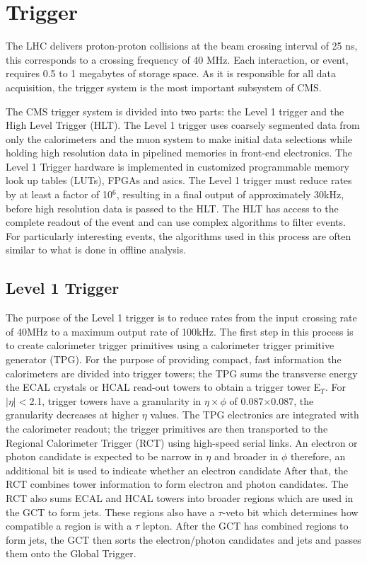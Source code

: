 \section{Trigger}
The LHC delivers proton-proton collisions at the beam crossing 
interval of 25 ns, this corresponds to a crossing frequency of 40 MHz.
Each interaction, or event, requires 0.5 to 1 megabytes of storage space.
As it is responsible for all data acquisition, %
the trigger system is the most important subsystem of CMS. 

The CMS trigger system is divided into two parts: the Level 1 trigger 
and the High Level Trigger (HLT). 
The Level 1 trigger uses coarsely segmented
data from only the calorimeters and the muon system to make initial
data selections while holding high resolution data in pipelined memories
in front-end electronics. The Level 1 Trigger hardware is implemented in customized
programmable memory look up tables (LUTs), FPGAs and asics.
The Level 1 trigger must reduce rates by at least a factor of 10$^{6}$, 
resulting in a final output of approximately 30kHz,
before high resolution data is passed to the HLT.
The HLT has access to the complete readout of the event and can use
complex algorithms to filter events. For particularly interesting events, 
the algorithms used in this process are often similar to what is done in 
offline analysis. 
  \subsection{Level 1 Trigger}
The purpose of the Level 1 trigger is to reduce rates from the input
crossing rate of 40MHz to a maximum output rate of 100kHz. 
The first step in this process is to create
calorimeter trigger primitives using a calorimeter trigger primitive generator (TPG).
For the purpose of providing compact, fast information the calorimeters
are divided into trigger towers; the TPG sums the transverse energy the
ECAL crystals or HCAL read-out towers to obtain a trigger tower E$_{T}$.
For $|\eta|<$2.1, trigger towers have a granularity
in $\eta \times \phi$ of 0.087$\times$0.087, the granularity decreases at higher
$\eta$ values. 
The TPG electronics are integrated with the calorimeter readout; the trigger primitives
are then transported to the Regional Calorimeter Trigger (RCT) using
high-speed serial links.
An electron or photon candidate is expected to be narrow in $\eta$
and broader in $\phi$ therefore, an additional bit is used to indicate whether 
an electron candidate  
After that, the RCT combines tower information to form electron and 
photon candidates. The RCT also sums ECAL and HCAL towers into broader
regions which are used in the GCT to form jets. These regions also have a 
$\tau$-veto bit which determines how compatible a region is with a
$\tau$ lepton. After the GCT has combined regions to form jets, the GCT
then sorts the electron/photon candidates and jets and passes them onto
the Global Trigger.

